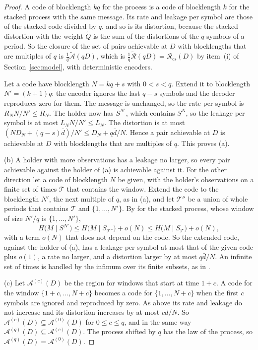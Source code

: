 \documentclass[11pt,onecolumn]{IEEEtran}
\begin{document}
\begin{proof}
A code of blocklength $kq$ for the process is a code of blocklength
$k$ for the stacked process with the same message. Its rate and
leakage per symbol are those of the stacked code divided by $q$, and
so is its distortion, because the stacked distortion with the weight
$\tilde Q$ is the sum of the distortions of the $q$ symbols of a
period. So the closure of the set of pairs achievable at $D$ with
blocklengths that are multiples of $q$ is
$\tfrac1q\tilde{\mathcal A}(qD)$, which is
$\tfrac1q\tilde{\mathcal R}(qD)=\mathcal R_{\mathrm{cs}}(D)$ by item~(i) of
Section~\ref{sec:model}, with deterministic encoders.

Let a code have blocklength $N=kq+s$ with $0<s<q$. Extend it to
blocklength $N'=(k+1)q$: the encoder ignores the last $q-s$ symbols
and the decoder reproduces zero for them. The message is unchanged, so
the rate per symbol is $R_NN/N'\le R_N$. The holder now has $S^{N'}$,
which contains $S^N$, so the leakage per symbol is at most
$L_NN/N'\le L_N$. The distortion is at most
$(ND_N+(q-s)\bar d)/N'\le D_N+q\bar d/N$. Hence a pair achievable at
$D$ is achievable at $D$ with blocklengths that are multiples of $q$.
This proves (a).

(b) A holder with more observations has a leakage no larger, so every
pair achievable against the holder of (a) is achievable against it.
For the other direction let a code of blocklength $N$ be given, with
the holder's observations on a finite set of times $\mathcal T$ that
contains the window. Extend the code to the blocklength $N'$, the next
multiple of $q$, as in (a), and let $\mathcal T''$ be a union of whole
periods that contains $\mathcal T$ and $\{1,\dots,N'\}$. By
\cite[Theorem~23]{part2} for the stacked process, whose window of size
$N'/q$ is $\{1,\dots,N'\}$,
\[
H\bigl(M\mid S^{N'}\bigr)\le H\bigl(M\mid S_{\mathcal T''}\bigr)+o(N)\le H\bigl(M\mid S_{\mathcal T}\bigr)+o(N),
\]
with a term $o(N)$ that does not depend on the code. So the extended
code, against the holder of (a), has a leakage per symbol at most that
of the given code plus $o(1)$, a rate no larger, and a distortion
larger by at most $q\bar d/N$. An infinite set of times is handled by
the infimum over its finite subsets, as in \cite{part2}.

(c) Let $\mathcal A^{(c)}(D)$ be the region for windows that start at
time $1+c$. A code for the window $\{1+c,\dots,N+c\}$ becomes a code
for $\{1,\dots,N+c\}$ when the first $c$ symbols are ignored and
reproduced by zero. As above its rate and leakage do not increase and
its distortion increases by at most $c\bar d/N$. So
$\mathcal A^{(c)}(D)\subseteq\mathcal A^{(0)}(D)$ for $0\le c\le q$, and in
the same way $\mathcal A^{(q)}(D)\subseteq\mathcal A^{(c)}(D)$. The
process shifted by $q$ has the law of the process, so
$\mathcal A^{(q)}(D)=\mathcal A^{(0)}(D)$.


\end{proof}
\end{document}
